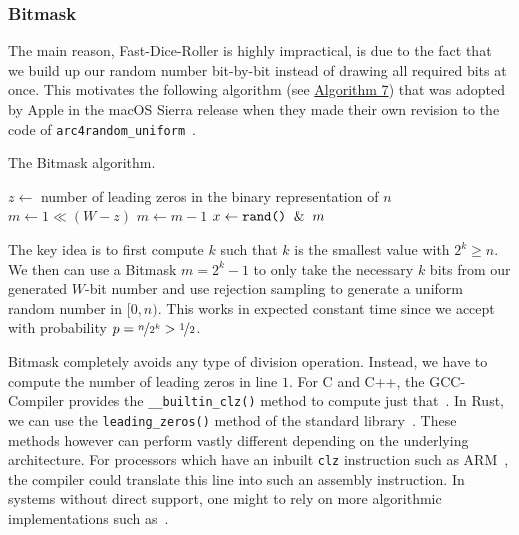 \documentclass[a4paper, UKenglish, cleveref, autoref, thm-restate]{lipics-v2021}
\begin{document}
\subsubsection{Bitmask}\label{sec:2.2.4}
The main reason, Fast-Dice-Roller is highly impractical, is due to the fact that we build up our random number bit-by-bit instead of drawing all required bits at once.
This motivates the following algorithm (see \hyperref[alg:bitmask]{Algorithm 7}) that was adopted by Apple in the macOS Sierra release when they made their own revision to the code of \texttt{arc4random\_uniform}~\cite{Apple}.

\begin{algorithm}[!htb] \label{alg:bitmask}
    \caption{The Bitmask algorithm.}
    \Require{source of uniformly-distributed random integers in $[0,2^W)$ given by \texttt{rand()}}
    $z \leftarrow$ number of leading zeros in the binary representation of $n$\;
    $m \leftarrow 1 \ll (W - z)$
    $m \leftarrow m - 1$\;
    $x \leftarrow \texttt{rand()} \And m$\;
    \;
\end{algorithm}

The key idea is to first compute $k$ such that $k$ is the smallest value with $2^k \geq n$.
We then can use a Bitmask $m = 2^k - 1$ to only take the necessary $k$ bits from our generated $W$-bit number and use rejection sampling to generate a uniform random number in $[0,n)$.
This works in expected constant time since we accept with probability $p = \nicefrac{n}{2^k} > \nicefrac{1}{2}$.

Bitmask completely avoids any type of division operation.
Instead, we have to compute the number of leading zeros in line $1$.
For C and C++, the GCC-Compiler provides the \texttt{\_\_builtin\_clz()} method to compute just that~\cite{GccCLZ}.
In Rust, we can use the \texttt{leading\_zeros()} method of the standard library~\cite{RustCLZ}.
These methods however can perform vastly different depending on the underlying architecture.
For processors which have an inbuilt \texttt{clz} instruction such as ARM~\cite{ArmCLZ}, the compiler could translate this line into such an assembly instruction.
In systems without direct support, one might to rely on more algorithmic implementations such as~\cite{ImplCLZ}.


\end{document}
